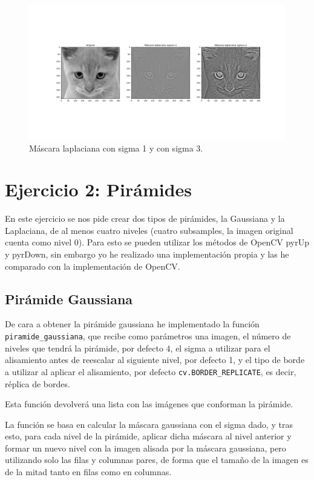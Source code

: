 \documentclass[12pt, spanish]{article}
\begin{document}
\begin{figure}[H]
  \centering
      \includegraphics[width=\textwidth]{ej1d.png}
 		 \caption{Máscara laplaciana con sigma 1 y con sigma 3.}
  		\label{fig:ej1d}

\end{figure}



\section{Ejercicio 2: Pirámides}

En este ejercicio se nos pide crear dos tipos de pirámides, la Gaussiana y la Laplaciana, de al menos cuatro niveles (cuatro subsamples, la imagen original cuenta como nivel 0). Para esto se pueden utilizar los métodos de OpenCV pyrUp y pyrDown, sin embargo yo he realizado una implementación propia y las he comparado con la implementación de OpenCV.

\subsection{Pirámide Gaussiana}

De cara a obtener la pirámide gaussiana he implementado la función \texttt{piramide\_gaussiana}, que recibe como parámetros una imagen, el número de niveles que tendrá la pirámide, por defecto 4, el sigma a utilizar para el alisamiento antes de reescalar al siguiente nivel, por defecto 1, y el tipo de borde a utilizar al aplicar el alisamiento, por defecto \texttt{cv.BORDER\_REPLICATE}, es decir, réplica de bordes.

Esta función devolverá una lista con las imágenes que conforman la pirámide.

La función se basa en calcular la máscara gaussiana con el sigma dado, y tras esto, para cada nivel de la pirámide, aplicar dicha máscara al nivel anterior y formar un nuevo nivel con la imagen alisada por la máscara gaussiana, pero utilizando solo las filas y columnas pares, de forma que el tamaño de la imagen es de la mitad tanto en filas como en columnas.
\end{document}
